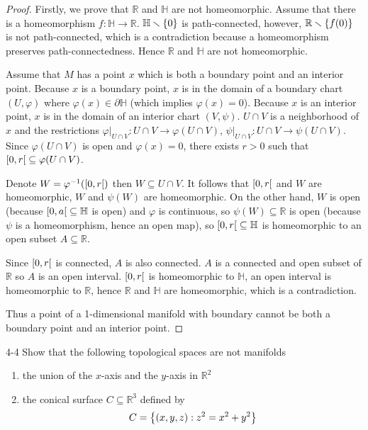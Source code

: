 \begin{proof}
	Firstly, we prove that $\mathbb{R}$ and $\mathbb{H}$ are not homeomorphic. Assume that there is a homeomorphism $f: \mathbb{H} \to \mathbb{R}$. $\mathbb{H}\smallsetminus\left\{{0}\right\}$ is path-connected, however, $\mathbb{R}\smallsetminus\left\{{f(0)}\right\}$ is not path-connected, which is a contradiction because a homeomorphism preserves path-connectedness. Hence $\mathbb{R}$ and $\mathbb{H}$ are not homeomorphic.

	Assume that $M$ has a point $x$ which is both a boundary point and an interior point. Because $x$ is a boundary point, $x$ is in the domain of a boundary chart $(U, \varphi)$ where $\varphi(x) \in \partial\mathbb{H}$ (which implies $\varphi(x) = 0$). Because $x$ is an interior point, $x$ is in the domain of an interior chart $(V, \psi)$. $U\cap V$ is a neighborhood of $x$ and the restrictions $\varphi\vert_{U\cap V}: U\cap V \to \varphi(U\cap V)$, $\psi\vert_{U\cap V}: U\cap V \to \psi(U\cap V)$. Since $\varphi(U\cap V)$ is open and $\varphi(x) = 0$, there exists $r > 0$ such that $\left[{0, r}\right[ \subseteq \varphi(U\cap V)$.

	Denote $W = \varphi^{-1}(\left[{0, r}\right[)$ then $W \subseteq U\cap V$. It follows that $\left[{0, r}\right[$ and $W$ are homeomorphic, $W$ and $\psi(W)$ are homeomorphic. On the other hand, $W$ is open (because $\left[{0, a}\right[ \subseteq \mathbb{H}$ is open) and $\varphi$ is continuous, so $\psi(W) \subseteq \mathbb{R}$ is open (because $\psi$ is a homeomorphism, hence an open map), so $\left[{0, r}\right[ \subseteq \mathbb{H}$ is homeomorphic to an open subset $A\subseteq \mathbb{R}$.

	Since $\left[{0, r}\right[$ is connected, $A$ is also connected. $A$ is a connected and open subset of $\mathbb{R}$ so $A$ is an open interval. $\left[{0, r}\right[$ is homeomorphic to $\mathbb{H}$, an open interval is homeomorphic to $\mathbb{R}$, hence $\mathbb{R}$ and $\mathbb{H}$ are homeomorphic, which is a contradiction.

	Thus a point of a 1-dimensional manifold with boundary cannot be both a boundary point and an interior point.
\end{proof}

\begin{problem}{4-4}
Show that the following topological spaces are not manifolds
\begin{enumerate}[label={(\alph*)}]
	\item the union of the $x$-axis and the $y$-axis in $\mathbb{R}^{2}$
	\item the conical surface $C\subseteq \mathbb{R}^{3}$ defined by
	      \begin{equation*}
		      C = \left\{{(x,y,z) : z^{2} = x^{2} + y^{2}}\right\}
	      \end{equation*}
\end{enumerate}
\end{problem}

